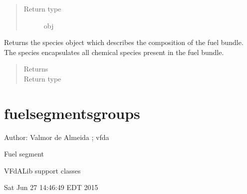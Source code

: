 \documentclass[letterpaper,10pt,openany,oneside,english]{sphinxmanual}
\begin{document}
\begin{fulllineitems}
\begin{fulllineitems}
\begin{quote}
\begin{description}
\item[{Return type}] \leavevmode
obj

\end{description}\end{quote}

\end{fulllineitems}


\begin{fulllineitems}
\label{\detokenize{support_rst/fuel_segment:fuel_segment.FuelSegment.species}}
Returns the species object which describes the composition of the fuel
bundle. The species encapsulates all chemical species present in the
fuel bundle.
\begin{quote}\begin{description}
\item[{Returns}] \leavevmode
{}

\item[{Return type}] \leavevmode
{}

\end{description}\end{quote}

\end{fulllineitems}


\end{fulllineitems}



\section{fuelsegmentsgroups}
\label{\detokenize{support_rst/fuelsegmentsgroups:module-fuelsegmentsgroups}}\label{\detokenize{support_rst/fuelsegmentsgroups:fuelsegmentsgroups}}\label{\detokenize{support_rst/fuelsegmentsgroups::doc}}
Author: Valmor de Almeida ; vfda

Fuel segment

VFdALib support classes

Sat Jun 27 14:46:49 EDT 2015
\end{document}

